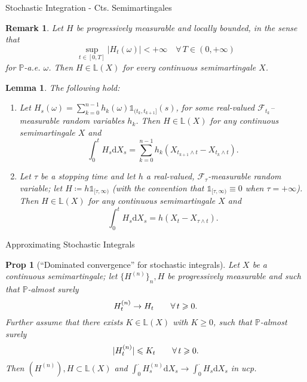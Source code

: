\documentclass[a4paper]{article}
\theoremstyle{mytheoremstyle}
\newtheorem{lemma}{Lemma}
\newtheorem{proposition}{Prop}
\newtheorem*{remark}{Remark}
\newcommand{\1}{\mathds{1}}
\begin{document}
\begin{multicols*}{3}
\begin{roundbox}{Stochastic Integration - Cts. Semimartingales}
\begin{remark}
  Let $H$ be progressively measurable and {\emph{locally bounded}}, in the
  sense that
  \[ \sup_{t \in [0, T]} | H_t (\omega) | < + \infty \quad \forall \, T \in
     (0, + \infty) \]
  for $\mathbb{P}$-a.e. $\omega$. Then $H \in \mathbb{L} (X)$ for every
  continuous semimartingale $X$.
\end{remark}

\begin{lemma}
  The following hold:
  \begin{enumerate}
    \item Let $H_s (\omega) = \sum_{k = 0}^{n - 1} h_k (\omega)
    \1_{(t_k, t_{k + 1}]} (s)$, for some real-valued
    $\mathcal{F}_{t_k}$--measurable random variables $h_k$. Then $H \in
    \mathbb{L} (X)$ for any continuous semimartingale $X$ and
    \begin{equation}
      \int_0^t H_s \mathrm{d} X_s = \sum_{k = 0}^{n - 1} h_k (X_{t_{k + 1} \wedge
      t} - X_{t_k \wedge t}) . \label{eq:identity.stochint.elementary}
    \end{equation}
    \item Let $\tau$ be a stopping time and let $h$ a real-valued,
    $\mathcal{F}_{\tau}$-measurable random variable; let $H \coloneq h
    \1_{[\tau, \infty)}$ (with the convention that $\1_{[\tau, \infty)} \equiv
    0$ when $\tau = + \infty$). Then $H \in \mathbb{L} (X)$ for any continuous
    semimartingale $X$ and
    \[ \int_0^t H_s \mathrm{d} X_s = h (X_t - X_{\tau \wedge t}) . \]
  \end{enumerate}
\end{lemma}
\end{roundbox}

\begin{roundbox}{Approximating Stochastic Integrals}
\begin{proposition}[``Dominated convergence'' for stochastic integrals]
  \label{prop:ito-domconv}Let $X$ be a continuous semimartingale; let $\{
  H^{(n)} \}_n, H$ be progressively measurable and such that
  $\mathbb{P}$\mbox{-}almost surely
  \vspace{-0.5em}
  \[
    H_t^{(n)} \to H_t \qquad \forall \, t \geqslant 0.
  \vspace{-0.5em}
  \]
  Further assume that there exists $K \in \mathbb{L} (X)$ with $K \geqslant
  0$, such that $\mathbb{P}$-almost surely
  \vspace{-0.5em}
  \begin{equation}
    | H^{(n)}_t | \leqslant K_t \qquad \forall \, t \geqslant 0.
    \label{eq:ito.domconv.assumption}
  \vspace{-0.5em}
  \end{equation}
  Then $(H^{(n)}), H \subset \mathbb{L} (X)$ and $\int_0^{\cdot} H^{(n)}_s
  \mathrm{d} X_s \rightarrow \int_0^{\cdot} H_s \mathrm{d} X_s$ in ucp.
\end{proposition}


\end{roundbox}
\end{multicols*}
\end{document}
